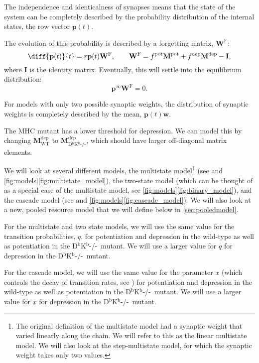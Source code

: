 \documentclass[12pt]{article}
\newcommand{\I}{\mathbf{I}}
\newcommand{\pr}{\mathbf{p}}
\newcommand{\eq}{\pr^\infty}
\newcommand{\w}{\mathbf{w}}
\newcommand{\W}{\mathbf{W}}
\newcommand{\frg}{\W^\mathrm{F}}
\newcommand{\M}{\mathbf{M}}
\newcommand{\pot}{^{\text{pot}}}
\newcommand{\dep}{^{\text{dep}}}
\newcommand{\wt}{_{\text{WT}}}
\newcommand{\ko}{_{\text{D$^\mathrm{b}$K$^\mathrm{b}$-/-}}}
\newcommand{\KO}{D$^\mathrm{b}$K$^\mathrm{b}$-/-}
\begin{document}
The independence and identicalness of synapses means that the state of the system can be completely described by the probability distribution of the internal states, the row vector $\pr(t)$.

The evolution of this probability is described by a forgetting matrix, $\frg$:
%
\begin{equation}\label{eq:evolve}
  \diff{\pr(t)}{t} = r\pr(t)\frg,
  \qquad
  \frg = f\pot\M\pot+f\dep\M\dep-\I,
\end{equation}
%
where $\I$ is the identity matrix.
Eventually, this will settle into the equilibrium distribution:
%
\begin{equation}\label{eq:eqprob}
  \eq\frg=0.
\end{equation}
%

For models with only two possible synaptic weights, the distribution of synaptic weights is completely described by the mean, $\pr(t)\w$.


The MHC mutant has a lower threshold for depression.
We can model this by changing $\M\dep\wt$ to $\M\dep\ko$, which should have larger off-diagonal matrix elements.

We will look at several different models,
the multistate model\footnote{The original definition of the multistate model had a synaptic weight that varied linearly along the chain. We will refer to this as the linear multistate model. We will also look at the step-multistate model, for which the synaptic weight takes only two values.} (see \cite{amit1994learning,Fusi2007multistate} and \autoref{fig:models}\ref{fig:multistate_model}),
the two-state model (which can be thought of as a special case of the multistate model, see \autoref{fig:models}\ref{fig:binary_model}),
and the cascade model (see \cite{Fusi2005cascade} and \autoref{fig:models}\ref{fig:cascade_model}).
We will also look at a new, pooled resource model that we will define below in \autoref{sec:pooledmodel}.

For the multistate and two state models, we will use the same value for the transition probabilities, $q$, for potentiation and depression in the wild-type as well as potentiation in the \KO\ mutant.
We will use a larger value for $q$ for depression in the \KO\ mutant.

For the cascade model, we will use the same value for the parameter $x$ (which controls the decay of transition rates, see \cite{Fusi2005cascade}) for potentiation and depression in the wild-type as well as potentiation in the \KO\ mutant.
We will use a larger value for $x$ for depression in the \KO\ mutant.
\end{document}
